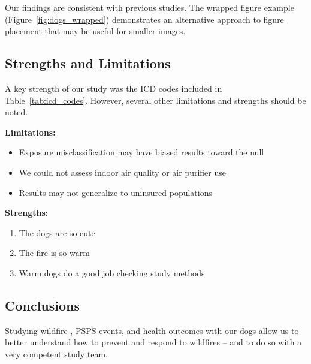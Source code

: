 \documentclass[../main.tex]{subfiles}
\begin{document}
Our findings are consistent with previous studies.\cite{harding_association_2025} The wrapped figure example (Figure~\ref{fig:dogs_wrapped}) demonstrates an alternative approach to figure placement that may be useful for smaller images.

\subsection{Strengths and Limitations}

A key strength of our study was the ICD codes included in Table~\ref{tab:icd_codes}. However, several other limitations and strengths should be noted.


\textbf{Limitations:}
\begin{itemize}
    \item Exposure misclassification may have biased results toward the null
    \item We could not assess indoor air quality or air purifier use
    \item Results may not generalize to uninsured populations
\end{itemize}

\textbf{Strengths:}
\begin{enumerate}
    \item The dogs are so cute
    \item The fire is so warm
    \item Warm dogs do a good job checking study methods
\end{enumerate}


\subsection{Conclusions}

Studying wildfire \PM, PSPS events, and health outcomes with our dogs allow us to better understand how to prevent and respond to wildfires -- and to do so with a very competent study team.

\clearpage
\end{document}
